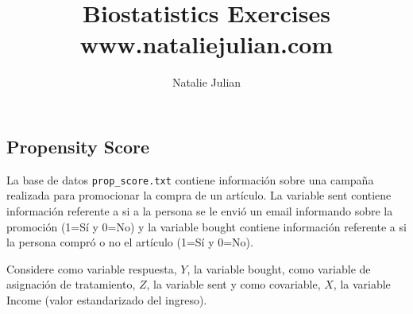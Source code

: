 \documentclass[11pt,onside]{article}
\title{\blue Biostatistics Exercises \\
\blueb www.nataliejulian.com}
\author{Natalie Julian}
\date{} %
\begin{document}


\maketitle

\subsection*{Propensity Score}

La base de datos \texttt{prop\_score.txt} contiene información sobre una campaña realizada para promocionar la compra de un artículo. La variable sent contiene información referente a si a la persona se le envió un email informando sobre la promoción (1=Sí y 0=No) y la variable bought contiene información referente a si la persona compró o no el artículo (1=Sí y 0=No).

Considere como variable respuesta, $Y$, la variable bought, como variable de asignación de tratamiento, $Z$, la variable sent y como covariable, $X$, la variable Income (valor estandarizado del ingreso).
\end{document}
